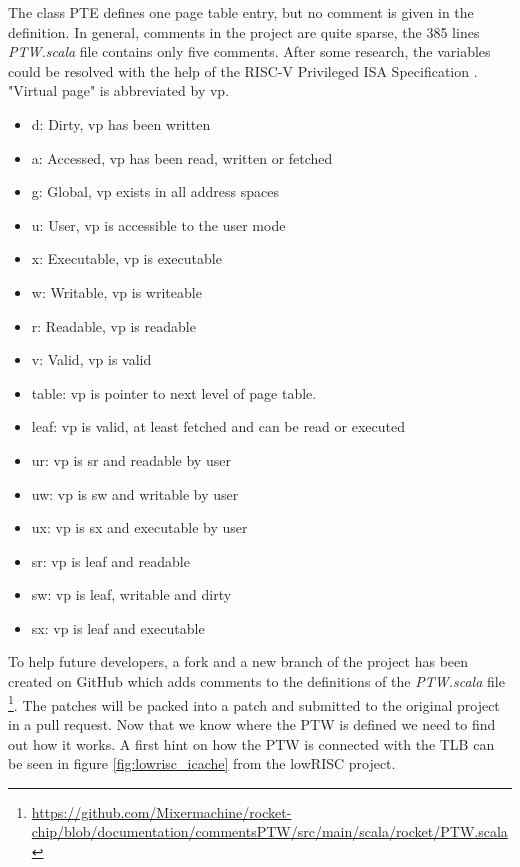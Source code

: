 The class PTE defines one page table entry, but no comment is given in
the definition. In general, comments in the project are quite sparse,
the 385 lines \textit{PTW.scala} file contains only five comments.
After some research, the variables could be resolved with the
help of the RISC-V Privileged ISA Specification
\cite[p.~59-61]{risc-v_isa_manual_priviliged_arch}.
"Virtual page" is abbreviated by vp.
\begin{itemize}
    \item d: Dirty, vp has been written
    \item a: Accessed, vp has been read, written or fetched
    \item g: Global, vp exists in all address spaces
    \item u: User, vp is accessible to the user mode
    \item x: Executable, vp is executable
    \item w: Writable, vp is writeable
    \item r: Readable, vp is readable
    \item v: Valid, vp is valid
    \item table: vp is pointer to next level of page table.
    \item leaf: vp is valid, at least fetched and can be read or executed
    \item ur: vp is sr and readable by user
    \item uw: vp is sw and writable by user
    \item ux: vp is sx and executable by user
    \item sr: vp is leaf and readable
    \item sw: vp is leaf, writable and dirty
    \item sx: vp is leaf and executable
\end{itemize}
To help future developers, a fork and a new branch of the project has been
created on GitHub which adds comments to the definitions of the \textit{PTW.scala} file
\footnote{\url{https://github.com/Mixermachine/rocket-chip/blob/documentation/commentsPTW/src/main/scala/rocket/PTW.scala}}.
The patches will be packed into a patch and submitted to the original
project in a pull request.
Now that we know where the PTW is defined we need to find out how it works.
A first hint on how the PTW is connected with the TLB can be seen in figure
\ref{fig:lowrisc_icache} from the lowRISC project.
